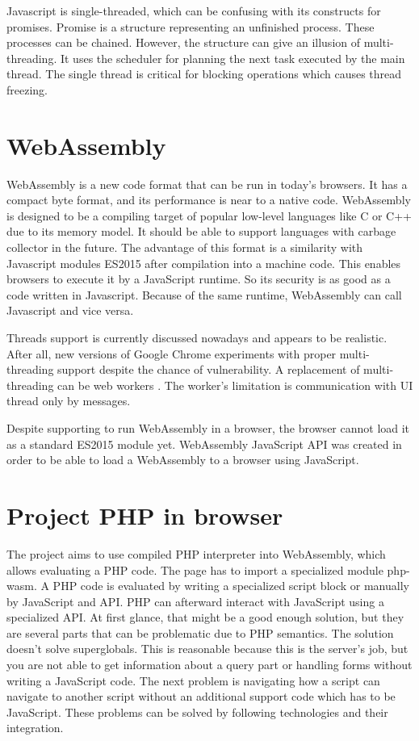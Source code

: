 Javascript is single-threaded, which can be confusing with its constructs for promises.
Promise is a structure representing an unfinished process.
These processes can be chained.
However, the structure can give an illusion of multi-threading. It uses the scheduler for planning the next task executed by the main thread.
The single thread is critical for blocking operations which causes thread freezing.

\section{WebAssembly}

WebAssembly  is a new code format that can be run in today's browsers. 
It has a compact byte format, and its performance is near to a native code. 
WebAssembly is designed to be a compiling target of popular low-level languages like C or C++ due to its memory model. 
It should be able to support languages with carbage collector in the future. 
The advantage of this format is a similarity with Javascript modules ES2015 after compilation into a machine code. 
This enables browsers to execute it by a JavaScript runtime. 
So its security is as good as a code written in Javascript. 
Because of the same runtime, WebAssembly can call Javascript and vice versa.

Threads  support is currently discussed nowadays and appears to be realistic.
After all, new versions of Google Chrome experiments with proper multi-threading support despite the chance of vulnerability.
A replacement of multi-threading can be web workers .
The worker's limitation is communication with UI thread only by messages.

Despite supporting to run WebAssembly in a browser, the browser cannot load it as a standard ES2015 module yet.
WebAssembly JavaScript API was created in order to be able to load a WebAssembly to a browser using JavaScript.

\section{Project PHP in browser}

The project  aims to use compiled PHP interpreter into WebAssembly, which allows evaluating a PHP code.
The page has to import a specialized module php-wasm. 
A PHP code is evaluated by writing a specialized script block or manually by JavaScript and API.
PHP can afterward interact with JavaScript using a specialized API.
At first glance, that might be a good enough solution, but they are several parts that can be problematic due to PHP semantics.
The solution doesn't solve superglobals. 
This is reasonable because this is the server's job, but you are not able to get information about a query part or handling forms without writing a JavaScript code.
The next problem is navigating how a script can navigate to another script without an additional support code which has to be JavaScript.
These problems can be solved by following technologies and their integration.

